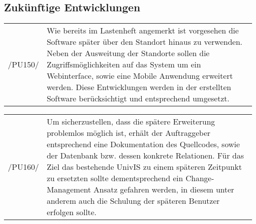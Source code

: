 \subsection{Zukünftige Entwicklungen}
\label{subsec:zukunftentw}

\begin{tabular}{p{1.5cm}p{14.5cm}}

	 /PU150/	&  Wie bereits im Lastenheft angemerkt ist vorgesehen die Software später über den Standort hinaus zu verwenden.
Neben der Ausweitung der Standorte sollen die Zugriffsmöglichkeiten auf das System um ein Webinterface, sowie eine Mobile Anwendung erweitert werden.
Diese Entwicklungen werden in der erstellten Software berücksichtigt und entsprechend umgesetzt.\\[0.25cm]


\end{tabular}

\begin{tabular}{p{1.5cm}p{14.5cm}}

	 /PU160/	&  Um sicherzustellen, dass die spätere Erweiterung problemlos möglich ist, erhält der Auftraggeber entsprechend eine Dokumentation des Quellcodes, sowie der Datenbank bzw. dessen konkrete Relationen.
Für das Ziel das bestehende UnivIS zu einem späteren Zeitpunkt zu ersetzten sollte dementsprechend ein Change-Management Ansatz gefahren werden, in diesem unter anderem auch die Schulung der späteren Benutzer erfolgen sollte. \\[0.25cm]


\end{tabular}


